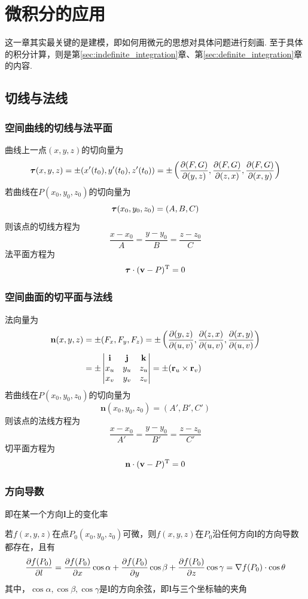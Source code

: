 
\section{微积分的应用}
这一章其实最关键的是建模，即如何用微元的思想对具体问题进行刻画. 至于具体的积分计算，则是第\ref{sec:indefinite_integration}章、第\ref{sec:definite_integration}章的内容.

\subsection{切线与法线}
\subsubsection{空间曲线的切线与法平面}
曲线上一点$(x,y,z)$的切向量为
\[\bm{\tau}(x,y,z)=\pm(x'(t_0),y'(t_0),z'(t_0))=\pm\left(\dfrac{\partial (F,G)}{\partial (y,z)},\dfrac{\partial (F,G)}{\partial (z,x)},\dfrac{\partial (F,G)}{\partial (x,y)}\right)\]
若曲线在$P(x_0,y_0,z_0)$的切向量为
\[\bm{\tau}(x_0,y_0,z_0)=(A,B,C)\]
则该点的切线方程为
\[\frac{x-x_0}{A}=\frac{y-y_0}{B}=\frac{z-z_0}{C}\]
法平面方程为
\[\bm{\tau}\cdot(\mathbf{v}-P)^{\mathrm{T}}=0\]

\subsubsection{空间曲面的切平面与法线}
法向量为
\[\begin{aligned}
\mathbf{n}(x,y,z)&=\pm(F_x,F_y,F_z)=\pm\left(\dfrac{\partial (y,z)}{\partial (u,v)},\dfrac{\partial (z,x)}{\partial (u,v)},\dfrac{\partial (x,y)}{\partial (u,v)}\right)\\
&=\pm\begin{vmatrix}\mathbf{i}&\mathbf{j}&\mathbf{k}\\x_u&y_u&z_u\\x_v&y_v&z_v\end{vmatrix}=\pm(\mathbf{r}_u\times\mathbf{r}_v)
\end{aligned}\]
若曲线在$P(x_0,y_0,z_0)$的切向量为
\[\mathbf{n}(x_0,y_0,z_0)=(A',B',C')\]
则该点的法线方程为
\[\frac{x-x_0}{A'}=\frac{y-y_0}{B'}=\frac{z-z_0}{C'}\]
切平面方程为
\[\mathbf{n}\cdot(\mathbf{v}-P)^{\mathrm{T}}=0\]

\subsubsection{方向导数}
即在某一个方向$\mathbf{l}$上的变化率
\begin{theorem}
若$f(x,y,z)$在点$P_0(x_0,y_0,z_0)$可微，则$f(x,y,z)$在$P_0$沿任何方向$\mathbf{l}$的方向导数都存在，且有
\[\dfrac{\partial f(P_0)}{\partial l}=\dfrac{\partial f(P_0)}{\partial x}\cos\alpha+\dfrac{\partial f(P_0)}{\partial y}\cos\beta+\dfrac{\partial f(P_0)}{\partial z}\cos\gamma=\nabla f(P_0)\cdot\cos\theta\]
其中，$\cos\alpha,\cos\beta,\cos\gamma$是$\mathbf{l}$的方向余弦，即$\mathbf{l}$与三个坐标轴的夹角
\end{theorem}

